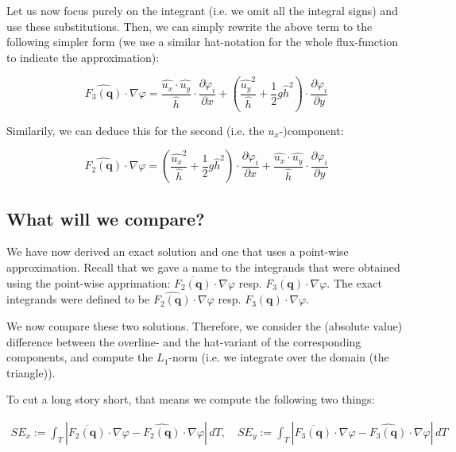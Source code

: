 \documentclass{article}
\newcommand{\pd}[2]{\dfrac{\partial #1}{\partial #2}}
\renewcommand{\phi}{\varphi}
\begin{document}
Let us now focus purely on the integrant (i.e. we omit all the integral signs) and use these substitutions. Then, we can simply rewrite the above term to the following simpler form (we use a similar hat-notation for the whole flux-function to indicate the approximation):

\begin{equation}
  \label{eq:stiffness-analysis-third-line-exact-approx-simple}
  \widehat{F_3\left(\mathbf{q}\right)} \cdot \nabla \phi= 
  \frac{\widehat{u_x} \cdot \widehat{u_y} }{\widehat{h}} \cdot \pd{\phi_i}{x} + 
  \left( \frac{\widehat{u_y}^2}{\widehat{h}} + \frac{1}{2} g \widehat{h}^2 \right) \cdot \pd{\phi_i}{y}
\end{equation}

Similarily, we can deduce this for the second (i.e. the $u_x$-)component:

\begin{equation}
  \label{eq:stiffness-analysis-second-line-exact-approx-simple}
  \widehat{F_2(\mathbf{q})} \cdot \nabla \phi = 
  \left( \frac{\widehat{u_x}^2}{\widehat{h}} + \frac{1}{2} g \widehat{h}^2 \right) \cdot \pd{\phi_i}{x} +
  \frac{\widehat{u_x} \cdot \widehat{u_y} }{\widehat{h}} \cdot \pd{\phi_i}{y}
\end{equation}

\subsection{What will we compare?}

We have now derived an exact solution and one that uses a point-wise approximation. Recall that we gave a name to the integrands that were obtained using the point-wise apprimation:  $\overline{F_2(\mathbf{q})} \cdot \nabla \phi$ resp. $\overline{F_3(\mathbf{q})} \cdot \nabla \phi$. The exact integrands were defined to be $\widehat{F_2(\mathbf{q})} \cdot \nabla \phi$ resp. $\widehat{F_3(\mathbf{q})} \cdot \nabla \phi$.

We now compare these two solutions. Therefore, we consider the (absolute value) difference between the overline- and the hat-variant of the corresponding components, and compute the $L_1$-norm (i.e. we integrate over the domain (the triangle)).

To cut a long story short, that means we compute the following two things:

\begin{eqnarray*}
  SE_x := \int_T \left| \overline{F_2(\mathbf{q})} \cdot \nabla \phi - \widehat{F_2(\mathbf{q})} \cdot \nabla \phi \right| \, dT, \quad
  SE_y := \int_T \left| \overline{F_3(\mathbf{q})} \cdot \nabla \phi - \widehat{F_3(\mathbf{q})} \cdot \nabla \phi \right| \, dT 
\end{eqnarray*}
\end{document}
